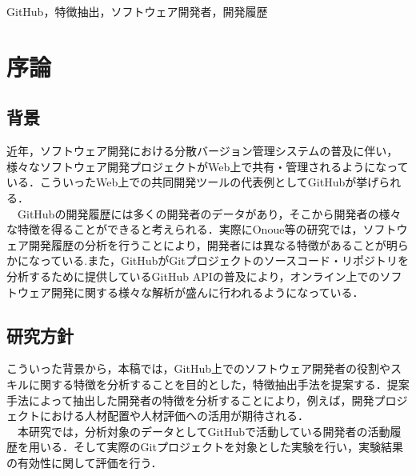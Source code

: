 \documentclass{funthesis}
\begin{document}
\begin{jkeyword}
GitHub，特徴抽出，ソフトウェア開発者，開発履歴
\end{jkeyword}

\tableofcontents %


\chapter{序論} %


\section{背景} %


近年，ソフトウェア開発における分散バージョン管理システムの普及に伴い，様々なソフトウェア開発プロジェクトがWeb上で共有・管理されるようになっている．こういったWeb上での共同開発ツールの代表例としてGitHub\cite{GitHub}が挙げられる．
\\　GitHubの開発履歴には多くの開発者のデータがあり，そこから開発者の様々な特徴を得ることができると考えられる．実際にOnoue等の研究では，ソフトウェア開発履歴の分析を行うことにより，開発者には異なる特徴があることが明らかになっている\cite{Onoue_English}.また，GitHubがGitプロジェクトのソースコード・リポジトリを分析するために提供しているGitHub API\cite{GitHub_API}の普及により，オンライン上でのソフトウェア開発に関する様々な解析が盛んに行われるようになっている\cite{Characteristic}．
\section{研究方針}

こういった背景から，本稿では，GitHub上でのソフトウェア開発者の役割やスキルに関する特徴を分析することを目的とした，特徴抽出手法を提案する．提案手法によって抽出した開発者の特徴を分析することにより，例えば，開発プロジェクトにおける人材配置や人材評価への活用が期待される．
\\　本研究では，分析対象のデータとしてGitHubで活動している開発者の活動履歴を用いる．そして実際のGitプロジェクトを対象とした実験を行い，実験結果の有効性に関して評価を行う．
\end{document}
